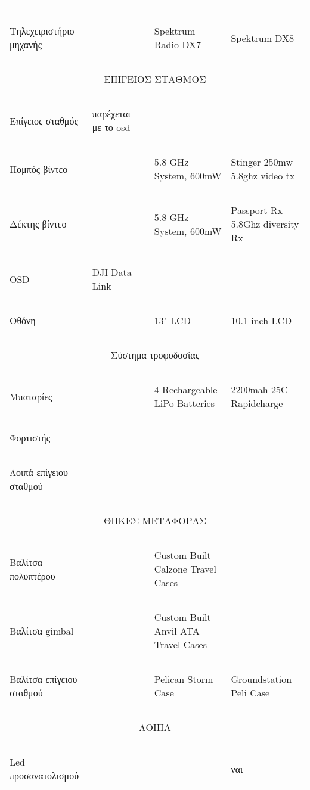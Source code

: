 \documentclass[a4paper, 12pt, twoside]{report}
\begin{document}
\begin{landscape}
\begin{longtable}{ m{3cm} m{2.2cm} m{2.2cm} m{2.2cm} m{2.2cm} }
				\hdashline
				~\\
				Τηλεχειριστήριο μηχανής & & & Spektrum Radio DX7 & Spektrum DX8\\
				\hdashline
				~\\
				\multicolumn{5}{c}{ΕΠΙΓΕΙΟΣ ΣΤΑΘΜΟΣ}\\
				\hline
				~\\
				Επίγειος σταθμός & παρέχεται με το osd & & & \\
				\hdashline
				~\\
				Πομπός βίντεο & & & 5.8 GHz System, 600mW & Stinger 250mw
5.8ghz video tx\\
				\hdashline
				~\\
				Δέκτης βίντεο & & & 5.8 GHz System, 600mW & Passport Rx
5.8Ghz diversity Rx\\
				\hdashline
				~\\
				OSD & DJI Data Link & & & \\
				\hdashline
				~\\
				Οθόνη & & & 13" LCD & 10.1 inch LCD\\
				\hdashline
				~\\
				\multicolumn{5}{c}{Σύστημα τροφοδοσίας}\\
				\hdashline
				~\\
				Μπαταρίες & & & 4 Rechargeable LiPo Batteries & 2200mah 25C Rapidcharge\\
				\hdashline
				~\\
				Φορτιστής & & & & \\
				\hdashline
				~\\
				Λοιπά επίγειου σταθμού & & & & \\
				\hdashline\
				~\\
				\multicolumn{5}{c}{ΘΗΚΕΣ ΜΕΤΑΦΟΡΑΣ}\\
				\hline
				~\\
				Βαλίτσα πολυπτέρου & & & Custom Built Calzone Travel Cases & \\
				\hdashline
				~\\
				Βαλίτσα gimbal & & & Custom Built Anvil ATA Travel Cases & \\
				\hdashline
				~\\
				Βαλίτσα επίγειου σταθμού & & & Pelican Storm Case & Groundstation Peli Case\\
				\hdashline
				~\\
				\multicolumn{5}{c}{ΛΟΙΠΑ}\\
				\hline
				~\\
				Led προσανατολισμού & & & & ναι\\

\end{longtable}
\end{landscape}
\end{document}
